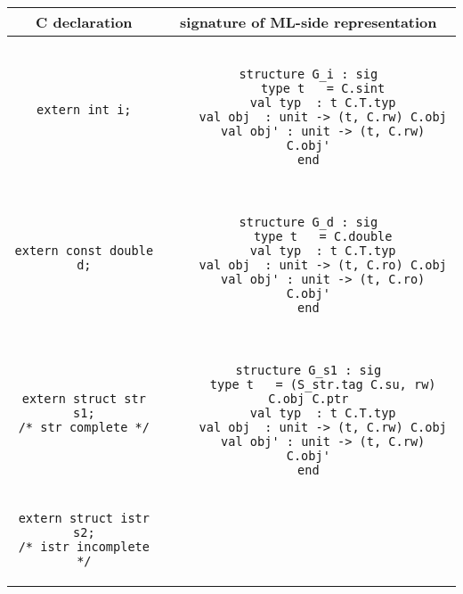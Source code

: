 \documentclass[titlepage,letterpaper]{article}
\begin{document}
\begin{small}
\begin{center}
\begin{tabular}{c|c}
C declaration & signature of ML-side representation \\ \hline\hline
\begin{minipage}{2in}
\begin{verbatim}
extern int i;
\end{verbatim}
\end{minipage}
&
\begin{minipage}{4in}
\begin{verbatim}

structure G_i : sig
    type t   = C.sint
    val typ  : t C.T.typ
    val obj  : unit -> (t, C.rw) C.obj
    val obj' : unit -> (t, C.rw) C.obj'
end

\end{verbatim}
\end{minipage}
\\ \hline
\begin{minipage}{2in}
\begin{verbatim}
extern const double d;
\end{verbatim}
\end{minipage}
&
\begin{minipage}{4in}
\begin{verbatim}

structure G_d : sig
    type t   = C.double
    val typ  : t C.T.typ
    val obj  : unit -> (t, C.ro) C.obj
    val obj' : unit -> (t, C.ro) C.obj'
end

\end{verbatim}
\end{minipage}
\\ \hline
\begin{minipage}{2in}
\begin{verbatim}
extern struct str s1;
/* str complete */
\end{verbatim}
\end{minipage}
&
\begin{minipage}{4in}
\begin{verbatim}

structure G_s1 : sig
    type t   = (S_str.tag C.su, rw) C.obj C.ptr
    val typ  : t C.T.typ
    val obj  : unit -> (t, C.rw) C.obj
    val obj' : unit -> (t, C.rw) C.obj'
end

\end{verbatim}
\end{minipage}
\\ \hline
\begin{minipage}{2in}
\begin{verbatim}
extern struct istr s2;
/* istr incomplete */
\end{verbatim}
\end{minipage}
&
\begin{minipage}{4in}
\begin{verbatim}


\end{verbatim}
\end{minipage}
\end{tabular}
\end{center}
\end{small}
\end{document}
